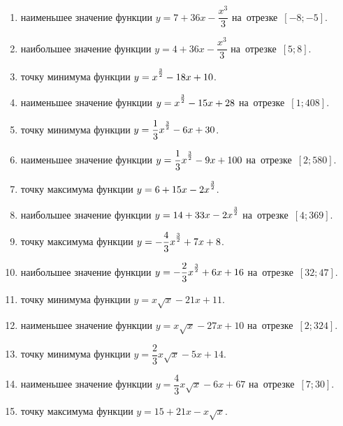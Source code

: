 \documentclass[a4paper,10pt]{article}
\begin{document}
\begin{enumerate}
\item {} наименьшее значение функции $y=7 +36x-\dfrac{x^3}{3}$ на~отрезке~$\left[-8;-5\right]$.

\item {} наибольшее значение функции $y=4 +36x-\dfrac{x^3}{3}$ на~отрезке~$\left[5;8\right]$.

\item {} точку минимума функции $y=x\strut^{\frac{3}{2}} -18x+10$.

\item {} наименьшее значение функции $y=x\strut^{\frac{3}{2}} -15x+28$ на~отрезке~$\left[1;408\right]$.

\item {} точку минимума функции $y=\dfrac{1}{3}x\strut^{\frac{3}{2}} -6x+30$.

\item {} наименьшее значение функции $y=\dfrac{1}{3}x\strut^{\frac{3}{2}} -9x+100$ на~отрезке~$\left[2;580\right]$.

\item {} точку максимума функции $y=6+15x-2x\strut^{\frac{3}{2}}$.

\item {} наибольшее значение функции $y=14+33x-2x\strut^{\frac{3}{2}}$ на~отрезке~$\left[4;369\right]$.

\item {} точку максимума функции $y=-\dfrac{4}{3}x\strut^{\frac{3}{2}} +7x+8$.

\item {} наибольшее значение функции $y=-\dfrac{2}{3}x\strut^{\frac{3}{2}} +6x+16$ на~отрезке~$\left[32;47\right]$.

\item {} точку минимума функции $y=x\sqrt{x} -21x+11$.

\item {} наименьшее значение функции $y=x\sqrt{x} -27x+10$ на~отрезке~$\left[2;324\right]$.

\item {} точку минимума функции $y=\dfrac{2}{3}x\sqrt{x} -5x+14$.

\item {} наименьшее значение функции $y=\dfrac{4}{3}x\sqrt{x} -6x+67$ на~отрезке~$\left[7;30\right]$.

\item {} точку максимума функции $y=15+21x -x\sqrt{x}$.


\end{enumerate}
\end{document}
